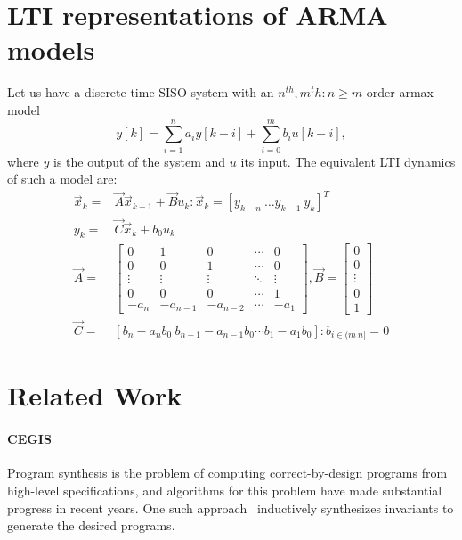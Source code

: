 \documentclass[runningheads,a4paper]{llncs}
\begin{document}
\section{LTI representations of ARMA models}

Let us have a discrete time SISO system with an $n^{th},m{^th} : n\geq m$ order armax model
$$y[k]=\sum_{i=1}^n a_iy[k-i]+\sum_{i=0}^m b_iu[k-i],$$
where $y$ is the output of the system and $u$ its input.
The equivalent LTI dynamics of such a model are:
\begin{align}
\vec{x}_k=&\vec{A}\vec{x}_{k-1}+\vec{B}u_k : \vec{x}_k=[y_{k-n}\ \hdots y_{k-1}\ y_{k}]^T\\
y_k=&\vec{C}\vec{x}_k + b_0u_k\nonumber\\
\vec{A}=&\left[
\begin{array}{ccccc}
0&1&0&\cdots&0\\
0&0&1&\cdots&0\\
\vdots&\vdots&\vdots&\ddots&\vdots\\
0&0&0&\cdots&1\\
-a_n&-a_{n-1}&-a_{n-2}&\cdots&-a_1
\end{array}\right],
\vec{B}=\left[
\begin{array}{c}
0\\0\\ \vdots\\ 0\\ 1
\end{array}\right]\nonumber\\
\vec{C}=&[b_n-a_nb_0\ b_{n-1}-a_{n-1}b_0 \cdots b_1-a_1b_0] : b_{i \in (m\ n]}=0\nonumber
\end{align}

\section{Related Work}

\paragraph{CEGIS}

Program synthesis is the problem of computing correct-by-design programs
from high-level specifications, and algorithms for this problem have made
substantial progress in recent years.  One such
approach~\cite{itzhaky2010simple} inductively synthesizes invariants to
generate the desired programs.
\end{document}
